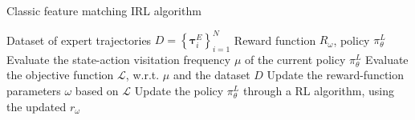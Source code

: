 \begin{algorithm}
\caption{Classic feature matching IRL algorithm}
\label{alg:irl}
\begin{algorithmic}
\label{alg:irl_algorithm}
\Require Dataset of expert trajectories $D = \left \{ \boldsymbol{\tau}^{E}_{i} \right \}^{N}_{i=1}$ 
\Require Reward function $R_{\omega}$, policy $\pi^{L}_{\theta}$ 
    \State Evaluate the state-action visitation frequency $\mu$ of the current policy $\pi^{L}_{\theta}$
    \State Evaluate the objective function $\mathcal{L}$, w.r.t. $\mu$ and the dataset $D$
    \State Update the reward-function parameters $\omega$ based on $\mathcal{L}$
    \State Update the policy $\pi^{L}_{\theta}$ through a RL algorithm, using the updated $r_{\omega}$
\EndWhile
\end{algorithmic}
\end{algorithm}